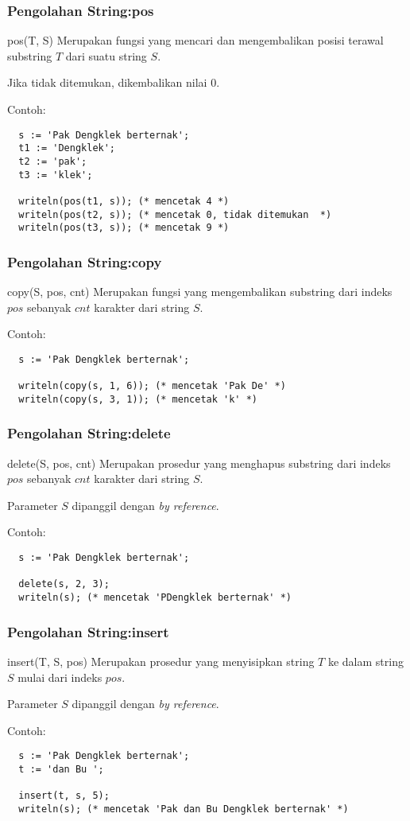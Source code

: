 \begin{frame}[fragile]
\frametitle{Pengolahan String:\newline pos}
\begin{block}{pos(T, S)}
Merupakan fungsi yang mencari dan mengembalikan posisi terawal substring $T$ dari suatu string $S$.

Jika tidak ditemukan, dikembalikan nilai 0.
\end{block}
Contoh:
\begin{lstlisting}
  s := 'Pak Dengklek berternak';
  t1 := 'Dengklek';
  t2 := 'pak';
  t3 := 'klek';

  writeln(pos(t1, s)); (* mencetak 4 *)
  writeln(pos(t2, s)); (* mencetak 0, tidak ditemukan  *)
  writeln(pos(t3, s)); (* mencetak 9 *)
\end{lstlisting}
\end{frame}

\begin{frame}[fragile]
\frametitle{Pengolahan String:\newline copy}
\begin{block}{copy(S, pos, cnt)}
Merupakan fungsi yang mengembalikan substring dari indeks $pos$ sebanyak $cnt$ karakter dari string $S$.
\end{block}
Contoh:
\begin{lstlisting}
  s := 'Pak Dengklek berternak';

  writeln(copy(s, 1, 6)); (* mencetak 'Pak De' *)
  writeln(copy(s, 3, 1)); (* mencetak 'k' *)
\end{lstlisting}
\end{frame}

\begin{frame}[fragile]
\frametitle{Pengolahan String:\newline delete}
\begin{block}{delete(S, pos, cnt)}
Merupakan prosedur yang menghapus substring dari indeks $pos$ sebanyak $cnt$ karakter dari string $S$.

Parameter $S$ dipanggil dengan \textit{by reference}.
\end{block}
Contoh:
\begin{lstlisting}
  s := 'Pak Dengklek berternak';

  delete(s, 2, 3);
  writeln(s); (* mencetak 'PDengklek berternak' *)
\end{lstlisting}
\end{frame}

\begin{frame}[fragile]
\frametitle{Pengolahan String:\newline insert}
\begin{block}{insert(T, S, pos)}
Merupakan prosedur yang menyisipkan string $T$ ke dalam string $S$ mulai dari indeks $pos$.

Parameter $S$ dipanggil dengan \textit{by reference}.
\end{block}
Contoh:
\begin{lstlisting}
  s := 'Pak Dengklek berternak';
  t := 'dan Bu ';

  insert(t, s, 5);
  writeln(s); (* mencetak 'Pak dan Bu Dengklek berternak' *)
\end{lstlisting}
\end{frame}

